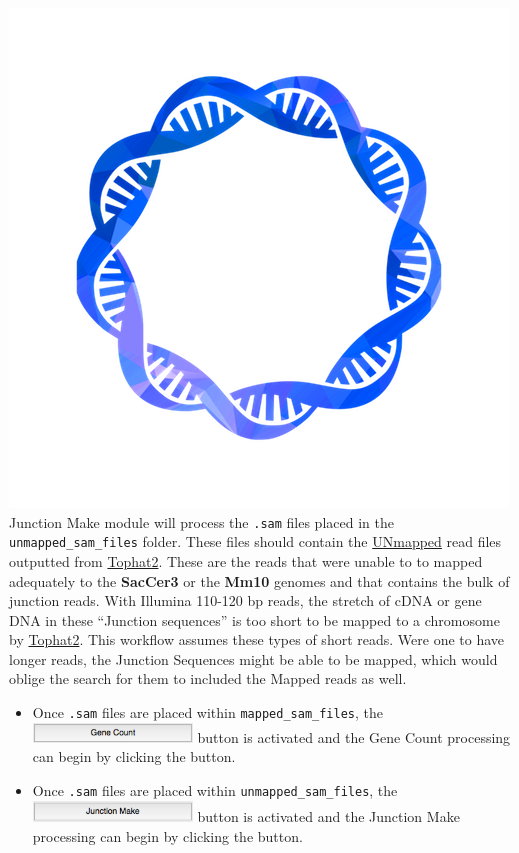 \documentclass[11pt,fleqn]{book} %
\newcommand{\GeneCount}{{\color{Red} Gene Count }}
\newcommand{\JunctionMake}{{\color{Blue} Junction Make }}
\begin{document}
\includegraphics[scale=0.3]{Pictures/junction_make.png} \JunctionMake module will process the \texttt{.sam} files placed in the \texttt{unmapped\_sam\_files} folder. These files should contain the \underline{UNmapped} read files outputted from \underline{Tophat2}.  These are the reads that were unable to to mapped adequately to the \textbf{SacCer3} or the \textbf{Mm10} genomes and that contains the bulk of junction reads. With Illumina 110-120 bp reads, the stretch of cDNA or gene DNA in these ``Junction sequences'' is too short to be mapped to a chromosome by \underline{Tophat2}. This workflow assumes these types of short reads.  Were one to have longer reads, the Junction Sequences might be able to be mapped, which would oblige the search for them to included the Mapped reads as well.\\

\begin{itemize}
	\item Once \texttt{.sam} files are placed within \texttt{mapped\_sam\_files}, the \includegraphics[width=120pt]{Pictures/gene_count_btn} button is activated and the \GeneCount processing can begin by clicking the button.
	\item Once \texttt{.sam} files are placed within \texttt{unmapped\_sam\_files}, the \includegraphics[width=120pt]{Pictures/junction_make_btn} button is activated and the \JunctionMake processing can begin by clicking the button.
\end{itemize}
\end{document}
